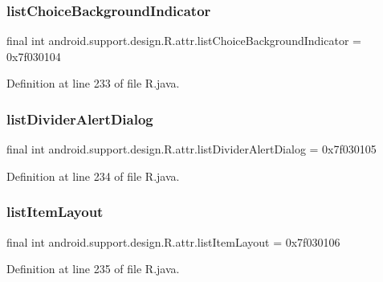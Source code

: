\subsubsection{\texorpdfstring{listChoiceBackgroundIndicator}{listChoiceBackgroundIndicator}}
{\footnotesize\ttfamily final int android.\+support.\+design.\+R.\+attr.\+list\+Choice\+Background\+Indicator = 0x7f030104\hspace{0.3cm}{\ttfamily [static]}}



Definition at line 233 of file R.\+java.

\mbox{\label{classandroid_1_1support_1_1design_1_1_r_1_1attr_a7218bfb0fa2e50c3a1ce684d85659d65}} 
\subsubsection{\texorpdfstring{listDividerAlertDialog}{listDividerAlertDialog}}
{\footnotesize\ttfamily final int android.\+support.\+design.\+R.\+attr.\+list\+Divider\+Alert\+Dialog = 0x7f030105\hspace{0.3cm}{\ttfamily [static]}}



Definition at line 234 of file R.\+java.

\mbox{\label{classandroid_1_1support_1_1design_1_1_r_1_1attr_a9a81a0eeb365ab02776b4193e8c9841e}} 
\subsubsection{\texorpdfstring{listItemLayout}{listItemLayout}}
{\footnotesize\ttfamily final int android.\+support.\+design.\+R.\+attr.\+list\+Item\+Layout = 0x7f030106\hspace{0.3cm}{\ttfamily [static]}}



Definition at line 235 of file R.\+java.

